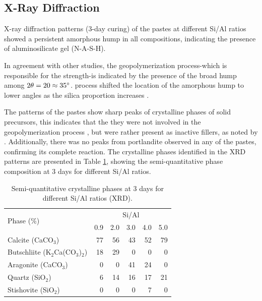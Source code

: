 \subsection{X-Ray Diffraction}

X-ray diffraction patterns (3-day curing) of the pastes at different Si/Al ratios showed a persistent amorphous hump in all compositions, indicating the presence of aluminosilicate gel (N-A-S-H).

In agreement with other studies, the geopolymerization process-which is responsible for the strength-is indicated by the presence of the broad hump among $2\theta = 20 \approx 35^{\circ}$.
process shifted the location of the amorphous hump to lower angles as the silica proportion increases \cite{arellano2014geopolymer,lee2017strength, wan2017geopolymerization}.

The patterns of the pastes show sharp peaks of crystalline phases of solid precursors, this indicates that the they were not involved in the geopolymerization process \cite{Geraldo2020}, but were rather present as inactive fillers, as noted by \cite{ruiz2012alkaline}.
Additionally, there was no peaks from portlandite observed in any of the pastes, confirming its complete reaction.
The crystalline phases identified in the XRD patterns are presented in Table \ref{tab:xrd_phases_pastes}, showing the semi-quantitative phase composition at 3 days for different Si/Al ratios.

\begin{table}[H]
    \centering
    \caption{Semi-quantitative crystalline phases at 3 days for different Si/Al ratios (XRD).}
    \label{tab:xrd_phases_pastes}
    \begin{tabular}{lrrrrr}
        \hline
        \multirow{2}{*}{Phase (\%)} &
        \multicolumn{5}{c}{Si/Al}\\
        \cline{2-6}
        & 0.9 & 2.0 & 3.0 & 4.0 & 5.0 \\
        \hline
        Calcite (CaCO$_3$) & 77 & 56 & 43 & 52 & 79 \\
        Butschliite (K$_2$Ca(CO$_3$)$_2$) & 18 & 29 & 0 & 0 & 0 \\
        Aragonite (CaCO$_3$) & 0 & 0 & 41 & 24 & 0 \\
        Quartz (SiO$_2$) & 6 & 14 & 16 & 17 & 21 \\
        Stishovite (SiO$_2$) & 0 & 0 & 0 & 7 & 0 \\
        \hline
    \end{tabular}
\end{table}

